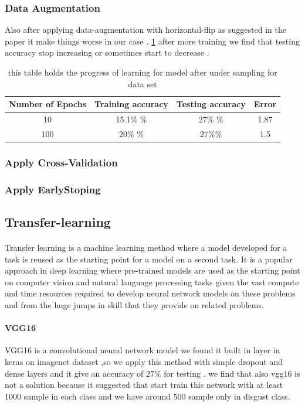 \subsubsection{Data Augmentation}
Also after applying data-augmentation with horizontal-flip as suggested in the paper\cite{state_of_art}
it make things worse in our case .
\ref{tab:table12} after more training we find that testing accuracy stop increasing or sometimes start to decrease .
\begin{table}[h!]
	\centering
	\caption{this table holds the progress of learning for model after under sampling for data set}
	\label{tab:table12}
	\begin{tabular}{c | c | c | c}
		\textbf{Number of Epochs} & \textbf{Training accuracy} & \textbf{Testing accuracy} & \textbf{Error}\\ \hline 
		10 & 15.1\% \% & 27\% \% & 1.87 \\
		100 & 20\% \% &  27\%\% & 1.5 \\
	\end{tabular}
\end{table}
\subsubsection{Apply Cross-Validation}
\subsubsection{Apply EarlyStoping}
\subsection{Transfer-learning}
\paragraph{}
Transfer learning is a machine learning method where a model developed for a task is reused as the starting point for a model on a second task.
It is a popular approach in deep learning where pre-trained models are used as the starting point on computer vision and natural language processing tasks given the vast compute and time resources required to develop neural network models on these problems and from the huge jumps in skill that they provide on related problems.
\paragraph{VGG16}
VGG16 is a convolutional neural network model we found it built in layer in keras on imagenet dataset ,so we apply this method with simple dropout and dense layers and it give an accuracy of 27\% for testing .
we find that also vgg16 is not a solution because it suggested that start train this network with at least 1000 sample in each class and we have around 500 sample only in disgust class.
